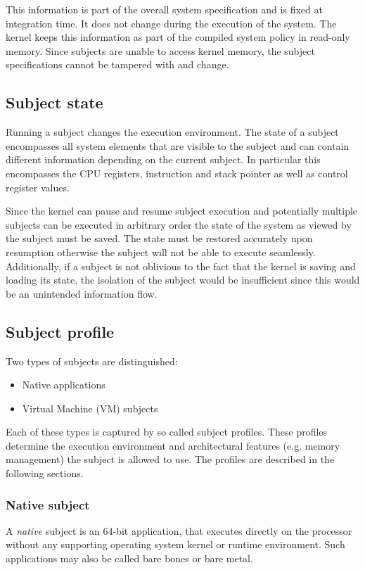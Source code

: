 This information is part of the overall system specification and is fixed at
integration time. It does not change during the execution of the system. The
kernel keeps this information as part of the compiled system policy in read-only
memory. Since subjects are unable to access kernel memory, the subject
specifications cannot be tampered with and change.

\subsection{Subject state}
Running a subject changes the execution environment. The state of a subject
encompasses all system elements that are visible to the subject and can contain
different information depending on the current subject. In particular this
encompasses the CPU registers, instruction and stack pointer as well as control
register values.

Since the kernel can pause and resume subject execution and potentially multiple
subjects can be executed in arbitrary order the state of the system as viewed by
the subject must be saved. The state must be restored accurately upon resumption
otherwise the subject will not be able to execute seamlessly. Additionally, if a
subject is not oblivious to the fact that the kernel is saving and loading its
state, the isolation of the subject would be insufficient since this would be an
unintended information flow.

\subsection{Subject profile}
Two types of subjects are distinguished:

\begin{itemize}
	\item Native applications
	\item Virtual Machine (VM) subjects
\end{itemize}

Each of these types is captured by so called subject profiles. These profiles
determine the execution environment and architectural features (e.g. memory
management) the subject is allowed to use. The profiles are described in the
following sections.

\subsubsection{Native subject}
A \emph{native} subject is an 64-bit application, that executes directly on the
processor without any supporting operating system kernel or runtime environment.
Such applications may also be called bare bones or bare metal.

